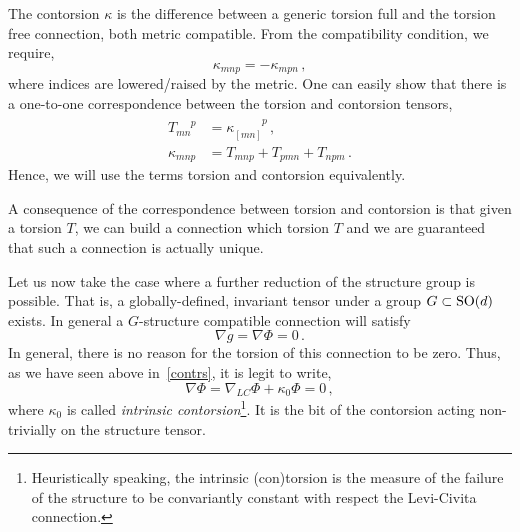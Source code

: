 \documentclass[debug]{phd}
\begin{document}
						The contorsion $\kappa$ is the difference between a generic torsion full and the torsion free connection, both metric compatible.
						From the compatibility condition, we require,
								\begin{equation}
									\kappa_{mnp} = - \kappa_{mpn}\, ,
								\end{equation}
						where indices are lowered/raised by the metric.
						One can easily show that there is a one-to-one correspondence between the torsion and contorsion tensors,
								\begin{align*}
									T_{mn}^{\phantom{mn}p} &= \kappa_{[mn]}^{\phantom{[mn]}p}\, , \\
									\kappa_{mnp} &= T_{mnp} + T_{pmn} + T_{npm} \, .
								\end{align*}
						Hence, we will use the terms torsion and contorsion equivalently.
						
						A consequence of the correspondence between torsion and contorsion is that given a torsion $T$, we can build a connection which torsion $T$ and we are guaranteed that such a connection is actually unique.
						
						Let us now take the case where a further reduction of the structure group is possible. 
						That is, a globally-defined, invariant tensor under a group $G \subset \mathrm{SO}(d)$ exists.
						In general a $G$-structure compatible connection will satisfy
								\begin{equation}
									\nabla g = \nabla \Phi = 0\, .
								\end{equation}
						In general, there is no reason for the torsion of this connection to be zero.
						Thus, as we have seen above in~\eqref{contrs}, it is legit to write,
								\begin{equation}
									\nabla \Phi = \nabla_{LC} \Phi + \kappa_0 \Phi = 0\, ,
								\end{equation}
						where $\kappa_0$ is called \emph{intrinsic contorsion}\footnote{%
							Heuristically speaking, the intrinsic (con)torsion is the measure of the failure of the structure to be convariantly constant with respect the Levi-Civita connection.
							}.
						It is the bit of the contorsion acting non-trivially on the structure tensor.
						
\end{document}
